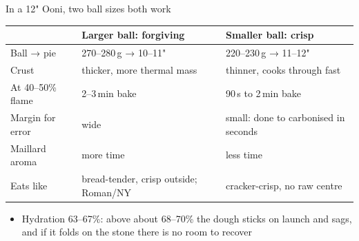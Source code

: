 \documentclass[aspectratio=169,11pt]{beamer}
\newcommand{\tablefont}{\footnotesize\renewcommand{\arraystretch}{1.15}}
\begin{document}
\begin{frame}{In a 12" Ooni, two ball sizes both work}
  \begingroup\tablefont\renewcommand{\arraystretch}{1.0}
  \begin{tabularx}{\linewidth}{@{}l Y Y@{}}
    \toprule
    & \textbf{Larger ball: forgiving} & \textbf{Smaller ball: crisp} \\
    \midrule
    Ball → pie & 270--280\,g → 10--11" & 220--230\,g → 11--12" \\
    Crust & thicker, more thermal mass & thinner, cooks through fast \\
    At 40--50\% flame & 2--3\,min bake & 90\,s to 2\,min bake \\
    Margin for error & wide & small: done to carbonised in seconds \\
    Maillard aroma & more time & less time \\
    Eats like & bread-tender, crisp outside; Roman/NY & cracker-crisp, no
      raw centre \\
    \bottomrule
  \end{tabularx}\endgroup
  \smallskip
  \small
  \begin{itemize}
    \item Hydration 63--67\%: above about 68--70\% the dough sticks on launch
      and sags, and if it folds on the stone there is no room to recover
  \end{itemize}
\end{frame}
\end{document}
